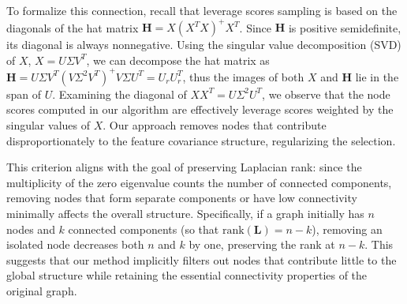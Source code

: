 \documentclass[conference]{IEEEtran}
\theoremstyle{definition}
\begin{document}
To formalize this connection, recall that leverage scores sampling is based on the diagonals of the hat matrix $\mathbf{H} = X (X^T X)^{+} X^T$.
Since $\mathbf{H}$ is positive semidefinite, its diagonal is always nonnegative. Using the singular value decomposition (SVD) of $X$, $X = U \Sigma V^T$,
we can decompose the hat matrix as $\mathbf{H} = U \Sigma V^T (V \Sigma^2 V^T)^{+} V \Sigma U^T = U_r U_r^T$, thus the images of both $X$ and $\mathbf{H}$ lie in the span of $U$. Examining the diagonal of $XX^T = U\Sigma^2U^T$, we observe that the node scores computed in our algorithm are {effectively leverage scores weighted by the singular values of} $X$. 
Our approach removes nodes that contribute disproportionately to the feature covariance structure, regularizing the selection.

This criterion aligns with the goal of {preserving Laplacian rank}: since the multiplicity of the zero eigenvalue counts the number of connected components, removing nodes that form separate components or have low connectivity minimally affects the overall structure. Specifically, if a graph initially has $n$ nodes and $k$ connected components (so that $\text{rank}(\mathbf{L}) = n - k$), removing an isolated node decreases both $n$ and $k$ by one, preserving the rank at $n - k$. This suggests that our method implicitly filters out nodes that contribute little to the global structure while retaining the essential connectivity properties of the original graph.
\end{document}
